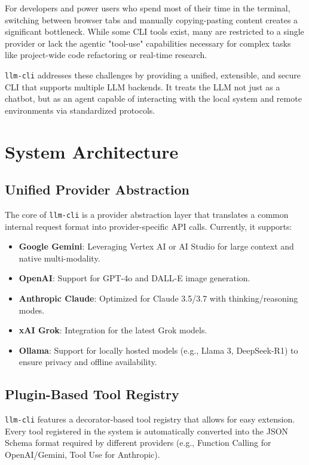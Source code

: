 \documentclass[conference]{IEEEtran}
\begin{document}
For developers and power users who spend most of their time in the terminal, switching between browser tabs and manually copying-pasting content creates a significant bottleneck. While some CLI tools exist, many are restricted to a single provider or lack the agentic "tool-use" capabilities necessary for complex tasks like project-wide code refactoring or real-time research.

\texttt{llm-cli} addresses these challenges by providing a unified, extensible, and secure CLI that supports multiple LLM backends. It treats the LLM not just as a chatbot, but as an agent capable of interacting with the local system and remote environments via standardized protocols.

\section{System Architecture}

\subsection{Unified Provider Abstraction}
The core of \texttt{llm-cli} is a provider abstraction layer that translates a common internal request format into provider-specific API calls. Currently, it supports:
\begin{itemize}
    \item \textbf{Google Gemini}: Leveraging Vertex AI or AI Studio for large context and native multi-modality.
    \item \textbf{OpenAI}: Support for GPT-4o and DALL-E image generation.
    \item \textbf{Anthropic Claude}: Optimized for Claude 3.5/3.7 with thinking/reasoning modes.
    \item \textbf{xAI Grok}: Integration for the latest Grok models.
    \item \textbf{Ollama}: Support for locally hosted models (e.g., Llama 3, DeepSeek-R1) to ensure privacy and offline availability.
\end{itemize}

\subsection{Plugin-Based Tool Registry}
\texttt{llm-cli} features a decorator-based tool registry that allows for easy extension. Every tool registered in the system is automatically converted into the JSON Schema format required by different providers (e.g., Function Calling for OpenAI/Gemini, Tool Use for Anthropic).
\end{document}
